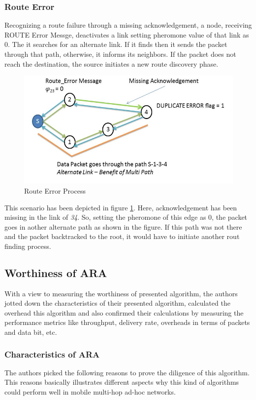 \subsubsection{Route Error}
Recognizing a route failure through a missing acknowledgement, a node, receiving ROUTE Error Messge, deactivates a link setting pheromone value of that link as 0. The it searches for an alternate link. If it finds then it sends the packet through that path, otherwise, it informs its neighbors. If the packet does not reach the destination, the source initiates a new route discovery phase.

\begin{figure}
    \centering
    \includegraphics[scale=0.6]{rout}
    \caption{Route Error Process}
    \label{rout}
\end{figure}

This scenario has been depicted in figure \ref{rout}. Here, acknowledgement has been missing in the link of \textit{34}. So, setting the pheromone of this edge as 0, the packet goes in aother alternate path as shown in the figure. If this path was not there and the packet backtracked to the root, it would have to initiate another rout finding process. 

\subsection{Worthiness of ARA}

With a view to measuring the worthiness of presented algorithm, the authors jotted down the characteristics of their presented algorithm, calculated the overhead this algorithm and also confirmed their calculations by measuring the performance metrics like throughput, delivery rate, overheads in terms of packets and data bit, etc.

\subsubsection{Characteristics of ARA}
The authors picked the following reasons to prove the diligence of this algorithm. This reasons basically illustrates different aspects
why this kind of algorithms could perform well in mobile
multi-hop ad-hoc networks. 


